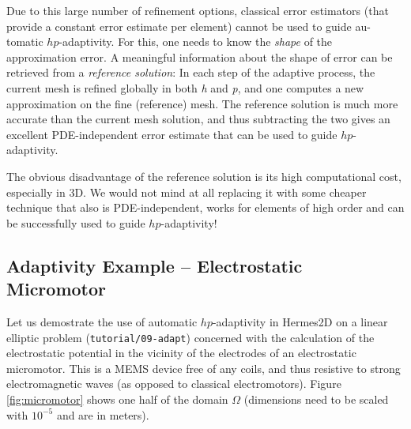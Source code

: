 \documentclass[11pt]{article}
\begin{document}
Due to this large number of refinement options, classical error estimators (that
provide a constant error estimate per element) cannot be used to guide au-
tomatic $hp$-adaptivity. For this, one needs to know the {\it shape} of the
approximation error. A meaningful information about the shape of error can be
retrieved from a {\it reference solution}: In each step of the adaptive process, the
current mesh is refined globally in both {\it h} and {\it p}, and one computes a new
approximation on the fine (reference) mesh. The reference solution is much
more accurate than the current mesh solution, and thus subtracting the two
gives an excellent PDE-independent error estimate that can be used to guide
$hp$-adaptivity.

The obvious disadvantage of the reference solution is its high computational cost, especially
in 3D. We would not mind at all replacing it with some cheaper
technique that also is PDE-independent, works for elements of high order and
can be successfully used to guide $hp$-adaptivity!

\subsection{Adaptivity Example -- Electrostatic Micromotor}

Let us demostrate the use of automatic $hp$-adaptivity in Hermes2D on a linear elliptic problem
({\tt tutorial/09-adapt}) concerned with the calculation of
the electrostatic potential in the vicinity of the electrodes of an electrostatic
micromotor. This is a MEMS device free of any coils, and thus resistive to
strong electromagnetic waves (as opposed to classical electromotors).
Figure \ref{fig:micromotor} shows one half of the domain $\Omega$
(dimensions need to be scaled with $10^{-5}$ and are in meters).
\end{document}
